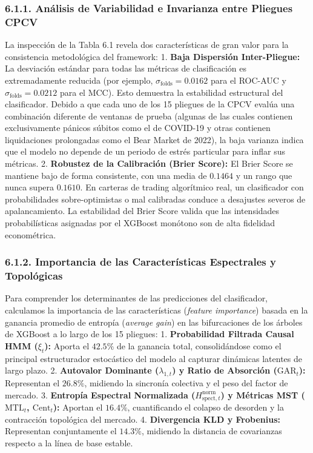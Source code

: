\documentclass[
  12pt,
]{article}
\begin{document}
\subsubsection{6.1.1. Análisis de Variabilidad e Invarianza entre
Pliegues
CPCV}\label{anuxe1lisis-de-variabilidad-e-invarianza-entre-pliegues-cpcv}

La inspección de la Tabla 6.1 revela dos características de gran valor
para la consistencia metodológica del framework: 1. \textbf{Baja
Dispersión Inter-Pliegue:} La desviación estándar para todas las
métricas de clasificación es extremadamente reducida (por ejemplo,
\(\sigma_{\text{folds}} = 0.0162\) para el ROC-AUC y
\(\sigma_{\text{folds}} = 0.0212\) para el MCC). Esto demuestra la
estabilidad estructural del clasificador. Debido a que cada uno de los
15 pliegues de la CPCV evalúa una combinación diferente de ventanas de
prueba (algunas de las cuales contienen exclusivamente pánicos súbitos
como el de COVID-19 y otras contienen liquidaciones prolongadas como el
Bear Market de 2022), la baja varianza indica que el modelo no depende
de un periodo de estrés particular para inflar sus métricas. 2.
\textbf{Robustez de la Calibración (Brier Score):} El Brier Score se
mantiene bajo de forma consistente, con una media de \(0.1464\) y un
rango que nunca supera \(0.1610\). En carteras de trading algorítmico
real, un clasificador con probabilidades sobre-optimistas o mal
calibradas conduce a desajustes severos de apalancamiento. La
estabilidad del Brier Score valida que las intensidades probabilísticas
asignadas por el XGBoost monótono son de alta fidelidad econométrica.

\subsubsection{6.1.2. Importancia de las Características Espectrales y
Topológicas}\label{importancia-de-las-caracteruxedsticas-espectrales-y-topoluxf3gicas}

Para comprender los determinantes de las predicciones del clasificador,
calculamos la importancia de las características (\emph{feature
importance}) basada en la ganancia promedio de entropía (\emph{average
gain}) en las bifurcaciones de los árboles de XGBoost a lo largo de los
15 pliegues: 1. \textbf{Probabilidad Filtrada Causal HMM (\(\xi_t\)):}
Aporta el \(42.5\%\) de la ganancia total, consolidándose como el
principal estructurador estocástico del modelo al capturar dinámicas
latentes de largo plazo. 2. \textbf{Autovalor Dominante
(\(\lambda_{1,t}\)) y Ratio de Absorción (\(\text{GAR}_t\)):}
Representan el \(26.8\%\), midiendo la sincronía colectiva y el peso del
factor de mercado. 3. \textbf{Entropía Espectral Normalizada
(\(H_{\text{spect}, t}^{\text{norm}}\)) y Métricas MST
(\(\text{MTL}_t\), \(\text{Cent}_t\)):} Aportan el \(16.4\%\),
cuantificando el colapso de desorden y la contracción topológica del
mercado. 4. \textbf{Divergencia KLD y Frobenius:} Representan
conjuntamente el \(14.3\%\), midiendo la distancia de covarianzas
respecto a la línea de base estable.
\end{document}
